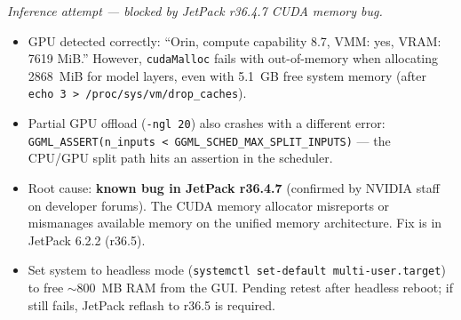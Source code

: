 \documentclass{article}
\theoremstyle{plain}
\theoremstyle{definition}
\theoremstyle{remark}
\begin{document}
\textit{Inference attempt --- blocked by JetPack r36.4.7 CUDA memory bug.}
\begin{itemize}
\item GPU detected correctly: ``Orin, compute capability 8.7, VMM: yes, VRAM: 7619 MiB.'' However, \texttt{cudaMalloc} fails with out-of-memory when allocating 2868~MiB for model layers, even with 5.1~GB free system memory (after \texttt{echo 3 > /proc/sys/vm/drop\_caches}).
\item Partial GPU offload (\texttt{-ngl 20}) also crashes with a different error: \texttt{GGML\_ASSERT(n\_inputs < GGML\_SCHED\_MAX\_SPLIT\_INPUTS)} --- the CPU/GPU split path hits an assertion in the scheduler.
\item Root cause: \textbf{known bug in JetPack r36.4.7} (confirmed by NVIDIA staff on developer forums). The CUDA memory allocator misreports or mismanages available memory on the unified memory architecture. Fix is in JetPack 6.2.2 (r36.5).
\item Set system to headless mode (\texttt{systemctl set-default multi-user.target}) to free $\sim$800~MB RAM from the GUI. Pending retest after headless reboot; if still fails, JetPack reflash to r36.5 is required.
\end{itemize}
\end{document}
